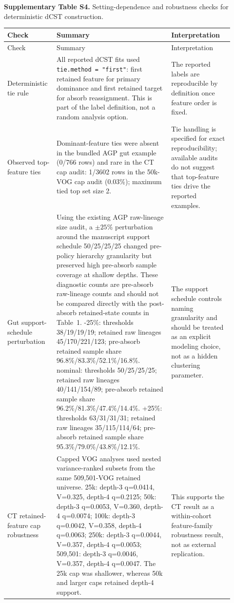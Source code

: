 \clearpage

\noindent\textbf{Supplementary Table S4.} Setting-dependence and robustness
checks for deterministic dCST construction.

\begin{longtable}{p{0.18\linewidth}p{0.48\linewidth}p{0.26\linewidth}}
\toprule
Check & Summary & Interpretation \\
\midrule
\endfirsthead
\toprule
Check & Summary & Interpretation \\
\midrule
\endhead
\bottomrule
\endfoot
Deterministic tie rule & All reported dCST fits used \texttt{tie.method = "first"}: first retained feature for primary dominance and first retained target for absorb reassignment. This is part of the label definition, not a random analysis option. & The reported labels are reproducible by definition once feature order is fixed. \\
\midrule
Observed top-feature ties & Dominant-feature ties were absent in the bundled AGP gut example (0/766 rows) and rare in the CT cap audit: 1/3602 rows in the 50k-VOG cap audit (0.03\%); maximum tied top set size 2. & Tie handling is specified for exact reproducibility; available audits do not suggest that top-feature ties drive the reported examples. \\
\midrule
Gut support-schedule perturbation & Using the existing AGP raw-lineage size audit, a \(\pm25\%\) perturbation around the manuscript support schedule 50/25/25/25 changed pre-policy hierarchy granularity but preserved high pre-absorb sample coverage at shallow depths. These diagnostic counts are pre-absorb raw-lineage counts and should not be compared directly with the post-absorb retained-state counts in Table~1. -25\%: thresholds 38/19/19/19; retained raw lineages 45/170/221/123; pre-absorb retained sample share 96.8\%/83.3\%/52.1\%/16.8\%. nominal: thresholds 50/25/25/25; retained raw lineages 40/141/154/89; pre-absorb retained sample share 96.2\%/81.3\%/47.4\%/14.4\%. +25\%: thresholds 63/31/31/31; retained raw lineages 35/115/114/64; pre-absorb retained sample share 95.3\%/79.0\%/43.8\%/12.1\%. & The support schedule controls naming granularity and should be treated as an explicit modeling choice, not as a hidden clustering parameter. \\
\midrule
CT retained-feature cap robustness & Capped VOG analyses used nested variance-ranked subsets from the same 509,501-VOG retained universe. 25k: depth-3 q=0.0414, V=0.325, depth-4 q=0.2125; 50k: depth-3 q=0.0053, V=0.360, depth-4 q=0.0074; 100k: depth-3 q=0.0042, V=0.358, depth-4 q=0.0063; 250k: depth-3 q=0.0044, V=0.357, depth-4 q=0.0053; 509,501: depth-3 q=0.0046, V=0.357, depth-4 q=0.0047. The 25k cap was shallower, whereas 50k and larger caps retained depth-4 support. & This supports the CT result as a within-cohort feature-family robustness result, not as external replication. \\

\end{longtable}
